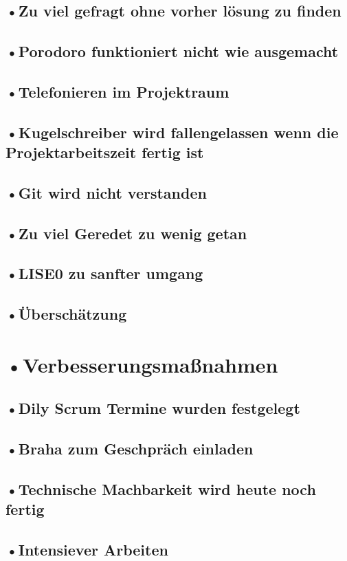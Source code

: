 \subsection{•Zu viel gefragt ohne vorher lösung zu finden}
\subsection{•Porodoro funktioniert nicht wie ausgemacht}
\subsection{•Telefonieren im Projektraum}
\subsection{•Kugelschreiber wird fallengelassen wenn die Projektarbeitszeit fertig ist}
\subsection{•Git wird nicht verstanden}
\subsection{•Zu viel Geredet zu wenig getan}
\subsection{•LISE0 zu sanfter umgang}
\subsection{•Überschätzung}

\section{•Verbesserungsmaßnahmen}
\subsection{•Dily Scrum Termine wurden festgelegt}
\subsection{•Braha zum Geschpräch einladen}
\subsection{•Technische Machbarkeit wird heute noch fertig}
\subsection{•Intensiever Arbeiten}
